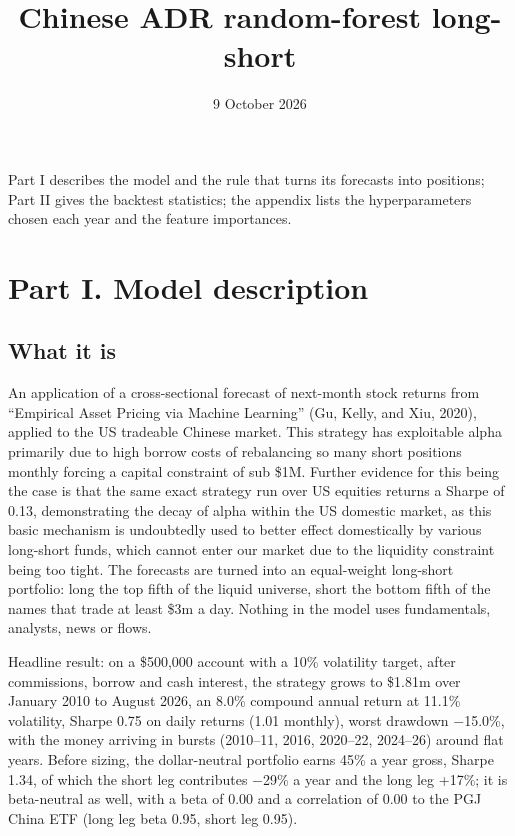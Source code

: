 \documentclass[
  10pt,
  a4paper,
]{article}
\title{Chinese ADR random-forest long-short}
\author{}
\date{9 October 2026}
\begin{document}
\maketitle

Part I describes the model and the rule that turns its
forecasts into positions; Part II gives the backtest
statistics; the appendix lists the hyperparameters chosen
each year and the feature importances.

\section{Part I. Model
description}\label{part-i.-model-description}

\subsection{What it is}\label{what-it-is}

An application of a cross-sectional forecast of next-month
stock returns from ``Empirical Asset Pricing via Machine
Learning'' (Gu, Kelly, and Xiu, 2020), applied to the US
tradeable Chinese market. This strategy has exploitable
alpha primarily due to high borrow costs of rebalancing so
many short positions monthly forcing a capital constraint of
sub \$1M. Further evidence for this being the case is that
the same exact strategy run over US equities returns a
Sharpe of 0.13, demonstrating the decay of alpha within the
US domestic market, as this basic mechanism is undoubtedly
used to better effect domestically by various long-short
funds, which cannot enter our market due to the liquidity
constraint being too tight. The forecasts are turned into an
equal-weight long-short portfolio: long the top fifth of the
liquid universe, short the bottom fifth of the names that
trade at least \$3m a day. Nothing in the model uses
fundamentals, analysts, news or flows.

Headline result: on a \$500,000 account with a 10\%
volatility target, after commissions, borrow and cash
interest, the strategy grows to \$1.81m over January 2010 to
August 2026, an 8.0\% compound annual return at 11.1\%
volatility, Sharpe 0.75 on daily returns (1.01 monthly),
worst drawdown −15.0\%, with the money arriving in bursts
(2010--11, 2016, 2020--22, 2024--26) around flat years.
Before sizing, the dollar-neutral portfolio earns 45\% a
year gross, Sharpe 1.34, of which the short leg contributes
−29\% a year and the long leg +17\%; it is beta-neutral as
well, with a beta of 0.00 and a correlation of 0.00 to the
PGJ China ETF (long leg beta 0.95, short leg 0.95).
\end{document}
